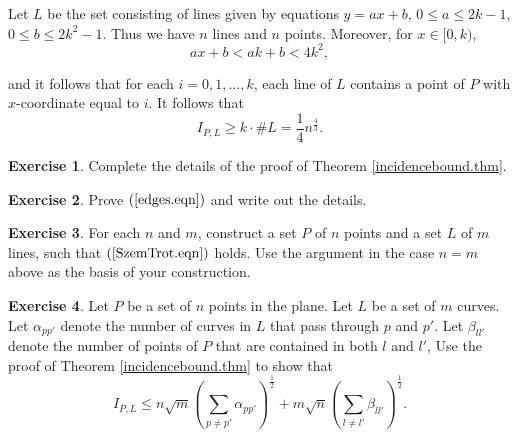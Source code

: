 \documentclass[]{amsart}
\numberwithin{equation}{section}
\theoremstyle{plain}
\theoremstyle{definition}
\newtheorem{exercise}{Exercise}[section]
\theoremstyle{remark}
\begin{document}
Let $L$ be the set consisting of lines given by equations $y=ax+b$,
$0 \leq a \leq 2k-1$, $0 \leq b \leq 2k^2-1$. Thus we have $n$ lines and
$n$ points. Moreover, for $x \in [0,k)$,
\begin{equation}
ax+b<ak+b<4k^2,
\end{equation}

 and it follows that for each $i=0, 1, \dots, k$,
each line of $L$ contains a point of $P$ with
$x$-coordinate equal to $i$. It follows that
\begin{equation}
I_{P,L} \ge k \cdot \# L=\frac{1}{4}n^{\frac{4}{3}}.
\end{equation}


\begin{exercise} \label{ex3.1}
Complete the details of the proof of Theorem \ref{incidencebound.thm}.
\end{exercise}

\begin{exercise} \label{ex3.2}
Prove $(\ref{edges.eqn})$ and write out the details.
\end{exercise}

\begin{exercise} \label{ex3.3}
For each $n$ and $m$, construct a set $P$
of $n$ points and a set $L$ of $m$ lines, such that $(\ref{SzemTrot.eqn})$ holds. Use
the argument in the case $n=m$ above as the basis of your construction.
\end{exercise}

\begin{exercise} \label{ex3.4}
Let $P$ be a set of $n$ points in the plane. Let
$L$ be a set of $m$ curves. Let $\alpha_{pp'}$ denote the number of
curves in $L$ that pass through $p$ and $p'$. Let $\beta_{ll'}$ denote
the number of points of $P$ that are contained in both $l$ and $l'$,
Use the proof of Theorem \ref{incidencebound.thm} to show that
\begin{equation}
I_{P,L} \leq n \sqrt{m} {\left(\sum_{p \not=p'} \alpha_{pp'}\right)}
^{\frac{1}{2}} + m \sqrt{n} {\left(\sum_{l \not=l'}
\beta_{ll'}\right)}^{\frac{1}{2}}.
\end{equation}
 \end{exercise}
\end{document}
